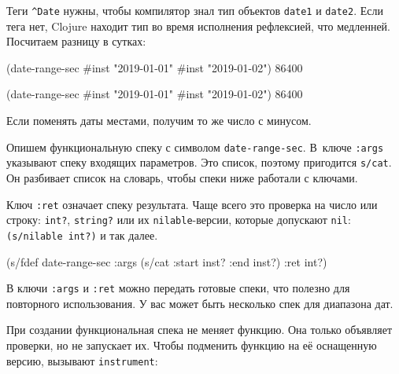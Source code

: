 \fi

Теги \verb|^Date| нужны, чтобы компилятор знал тип объектов \verb|date1| и
\verb|date2|. Если тега нет, Clojure находит тип во время исполнения
рефлексией, что медленней. Посчитаем разницу в сутках:

\ifx\devicetype\mobile

\begin{english}
  \begin{clojure}
(date-range-sec #inst "2019-01-01"
                #inst "2019-01-02")
86400
  \end{clojure}
\end{english}

\else

\begin{english}
  \begin{clojure}
(date-range-sec #inst "2019-01-01" #inst "2019-01-02")
86400
  \end{clojure}
\end{english}

\fi

\noindent
Если поменять даты местами, получим то же число с минусом.

Опишем функциональную спеку с символом \verb|date-range-sec|. В~ключе
\verb|:args| указывают спеку входящих параметров. Это список, поэтому пригодится
\verb|s/cat|. Он разбивает список на словарь, чтобы спеки ниже работали с
ключами.

Ключ \verb|:ret| означает спеку результата. Чаще всего это проверка на число или
строку: \verb|int?|, \verb|string?| или их \verb|nilable|-версии, которые
допускают \verb|nil|: \verb|(s/nilable int?)| и так далее.


\begin{english}
  \begin{clojure}
(s/fdef date-range-sec
  :args (s/cat :start inst? :end inst?)
  :ret int?)
  \end{clojure}
\end{english}

В ключи \verb|:args| и \verb|:ret| можно передать готовые спеки, что полезно
для повторного использования. У вас может быть несколько спек для диапазона дат.

При создании функциональная спека не меняет функцию. Она только объявляет
проверки, но не запускает их. Чтобы подменить функцию на её оснащенную версию,
вызывают \verb|instrument|:

\ifx\devicetype\mobile

